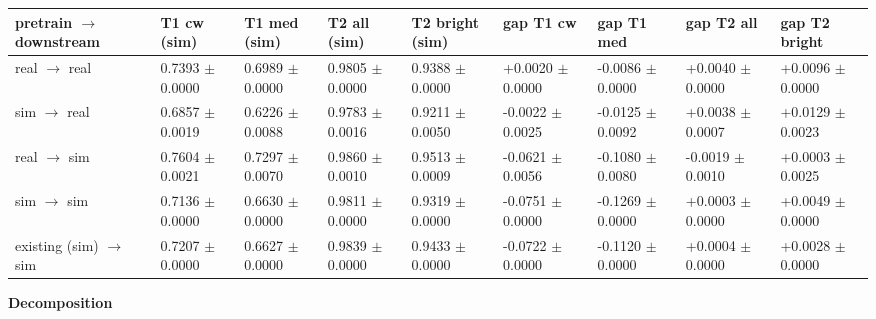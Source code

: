 \documentclass[10pt,a4paper]{article}
\begin{document}
\begin{center}\scriptsize
\setlength{\tabcolsep}{3pt}\renewcommand{\arraystretch}{1.15}
\begin{tabularx}{\linewidth}{LLLLLLLLL}
\toprule
\textbf{pretrain $\rightarrow$ downstream} & \textbf{T1 cw (sim)} & \textbf{T1 med (sim)} & \textbf{T2 all (sim)} & \textbf{T2 bright (sim)} & \textbf{gap T1 cw} & \textbf{gap T1 med} & \textbf{gap T2 all} & \textbf{gap T2 bright} \\
\midrule
real $\rightarrow$ real & 0.7393 $\pm$ 0.0000 & 0.6989 $\pm$ 0.0000 & 0.9805 $\pm$ 0.0000 & 0.9388 $\pm$ 0.0000 & +0.0020 $\pm$ 0.0000 & -0.0086 $\pm$ 0.0000 & +0.0040 $\pm$ 0.0000 & +0.0096 $\pm$ 0.0000 \\
sim $\rightarrow$ real & 0.6857 $\pm$ 0.0019 & 0.6226 $\pm$ 0.0088 & 0.9783 $\pm$ 0.0016 & 0.9211 $\pm$ 0.0050 & -0.0022 $\pm$ 0.0025 & -0.0125 $\pm$ 0.0092 & +0.0038 $\pm$ 0.0007 & +0.0129 $\pm$ 0.0023 \\
real $\rightarrow$ sim & 0.7604 $\pm$ 0.0021 & 0.7297 $\pm$ 0.0070 & 0.9860 $\pm$ 0.0010 & 0.9513 $\pm$ 0.0009 & -0.0621 $\pm$ 0.0056 & -0.1080 $\pm$ 0.0080 & -0.0019 $\pm$ 0.0010 & +0.0003 $\pm$ 0.0025 \\
sim $\rightarrow$ sim & 0.7136 $\pm$ 0.0000 & 0.6630 $\pm$ 0.0000 & 0.9811 $\pm$ 0.0000 & 0.9319 $\pm$ 0.0000 & -0.0751 $\pm$ 0.0000 & -0.1269 $\pm$ 0.0000 & +0.0003 $\pm$ 0.0000 & +0.0049 $\pm$ 0.0000 \\
existing (sim) $\rightarrow$ sim & 0.7207 $\pm$ 0.0000 & 0.6627 $\pm$ 0.0000 & 0.9839 $\pm$ 0.0000 & 0.9433 $\pm$ 0.0000 & -0.0722 $\pm$ 0.0000 & -0.1120 $\pm$ 0.0000 & +0.0004 $\pm$ 0.0000 & +0.0028 $\pm$ 0.0000 \\
\bottomrule
\end{tabularx}
\end{center}
\textbf{Decomposition}
\end{document}
